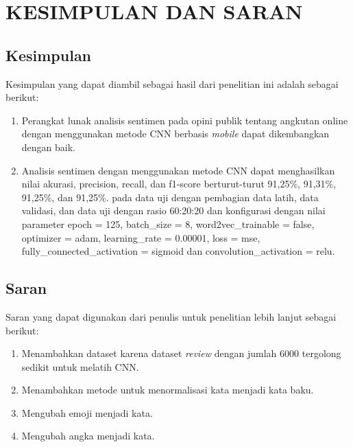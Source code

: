 \pagestyle{fancy}
\rhead{}
\setcounter{page}{1}
\chapter{KESIMPULAN DAN SARAN}

\section{Kesimpulan}
Kesimpulan yang dapat diambil sebagai hasil dari penelitian ini adalah sebagai berikut:
\begin{enumerate}
  \item Perangkat lunak analisis sentimen pada opini publik tentang angkutan online dengan menggunakan
        metode CNN berbasis \emph{mobile} dapat dikembangkan dengan baik.
  \item Analisis sentimen dengan menggunakan metode CNN dapat menghasilkan nilai akurasi, precision,
        recall, dan f1-score berturut-turut 91,25\%, 91,31\%, 91,25\%, dan 91,25\%. pada data uji dengan pembagian
        data latih, data validasi, dan data uji dengan rasio 60:20:20 dan konfigurasi dengan nilai parameter
        epoch = 125, batch\_size = 8, word2vec\_trainable = false, optimizer = adam, learning\_rate = 0.00001,
        loss = mse, fully\_connected\_activation = sigmoid dan convolution\_activation = relu.
\end{enumerate}

\section{Saran}
Saran yang dapat digunakan dari penulis untuk penelitian lebih lanjut sebagai berikut:
\begin{enumerate}
  \item Menambahkan dataset karena dataset \emph{review} dengan jumlah 6000 tergolong sedikit untuk melatih CNN\@.
  \item Menambahkan metode untuk menormalisasi kata menjadi kata baku. 
  \item Mengubah emoji menjadi kata. 
  \item Mengubah angka menjadi kata.
\end{enumerate}
